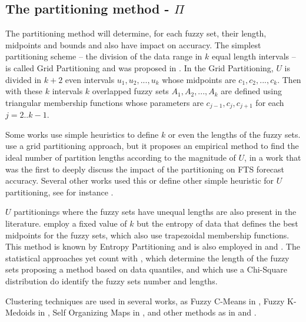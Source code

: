 %
\subsection{The partitioning method - $\Pi$}
\label{sec:fts_partitioningmethod}

The partitioning method will determine, for each fuzzy set,  their length, midpoints and bounds and also have impact on accuracy. The simplest partitioning scheme -- the division of the data range in $k$ equal length intervals -- is called Grid Partitioning and was proposed in \cite{song1993fuzzy}.  In the Grid Partitioning, $U$ is divided in $k+2$ even intervals $u_1, u_2, ..., u_k$ whose midpoints are $c_1, c_2, ..., c_k$. Then with these $k$ intervals $k$ overlapped fuzzy sets $A_1,A_2,...,A_k$ are defined using triangular membership functions whose parameters are $c_{j-1},c_j,c_{j+1}$ for each $j = 2..k-1$. 

Some works use simple heuristics to define $k$ or even the lengths of the fuzzy sets. \cite{huarng2001effective} use a grid partitioning approach, but it proposes an empirical method to find the ideal number of partition lengths according to the magnitude of $U$, in a work that was the first to deeply discuss the impact of the partitioning on FTS forecast accuracy. Several other works used this or define other simple heuristic for $U$ partitioning, see for instance \cite{Chang1997, huarng2005type, Rubio2016, Cheng2018}.

$U$ partitionings where the fuzzy sets have unequal lengths are also present in the literature. \cite{Cheng2006a} employ a fixed value of $k$ but the entropy of data that defines the best midpoints for the fuzzy sets, which also use trapezoidal membership functions. This method is known by Entropy Partitioning and is also employed in \cite{Cheng2008} and \cite{Chen2014}. The statistical approaches yet count with \cite{Ismail2015}, which determine the length of the fuzzy sets proposing a method based on data quantiles, and \cite{Yang2017} which use a Chi-Square distribution do identify the fuzzy sets number and lengths.

Clustering techniques are used in several works, as Fuzzy C-Means in \cite{Li2008b, Askari2015, Bas2015, Sun2015, Yolcu2017}, Fuzzy K-Medoids in \cite{Dincer2018}, Self Organizing Maps in \cite{Bahrepour2011}, and other methods as in \cite{Saberi2017} and \cite{Bose2017}.

